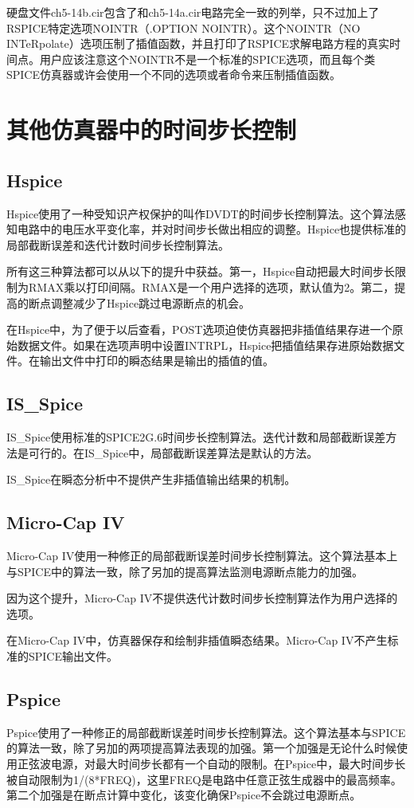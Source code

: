 硬盘文件ch5-14b.cir包含了和ch5-14a.cir电路完全一致的列举，只不过加上了RSPICE特定选项NOINTR（.OPTION NOINTR）。这个NOINTR（NO INTeRpolate）选项压制了插值函数，并且打印了RSPICE求解电路方程的真实时间点。用户应该注意这个NOINTR不是一个标准的SPICE选项，而且每个类SPICE仿真器或许会使用一个不同的选项或者命令来压制插值函数。

\section{其他仿真器中的时间步长控制}
\subsection{Hspice}
Hspice使用了一种受知识产权保护的叫作DVDT的时间步长控制算法。这个算法感知电路中的电压水平变化率，并对时间步长做出相应的调整。Hspice也提供标准的局部截断误差和迭代计数时间步长控制算法。

所有这三种算法都可以从以下的提升中获益。第一，Hspice自动把最大时间步长限制为RMAX乘以打印间隔。RMAX是一个用户选择的选项，默认值为2。第二，提高的断点调整减少了Hspice跳过电源断点的机会。

在Hspice中，为了便于以后查看，POST选项迫使仿真器把非插值结果存进一个原始数据文件。如果在选项声明中设置INTRPL，Hspice把插值结果存进原始数据文件。在输出文件中打印的瞬态结果是输出的插值的值。

\subsection{IS\_{Spice}}
IS\_{Spice}使用标准的SPICE2G.6时间步长控制算法。迭代计数和局部截断误差方法是可行的。在IS\_{Spice}中，局部截断误差算法是默认的方法。

IS\_{Spice}在瞬态分析中不提供产生非插值输出结果的机制。

\subsection{Micro-Cap IV}
Micro-Cap IV使用一种修正的局部截断误差时间步长控制算法。这个算法基本上与SPICE中的算法一致，除了另加的提高算法监测电源断点能力的加强。

因为这个提升，Micro-Cap IV不提供迭代计数时间步长控制算法作为用户选择的选项。

在Micro-Cap IV中，仿真器保存和绘制非插值瞬态结果。Micro-Cap IV不产生标准的SPICE输出文件。

\subsection{Pspice}
Pspice使用了一种修正的局部截断误差时间步长控制算法。这个算法基本与SPICE的算法一致，除了另加的两项提高算法表现的加强。第一个加强是无论什么时候使用正弦波电源，对最大时间步长都有一个自动的限制。在Pspice中，最大时间步长被自动限制为1/(8*FREQ)，这里FREQ是电路中任意正弦生成器中的最高频率。第二个加强是在断点计算中变化，该变化确保Pspice不会跳过电源断点。

